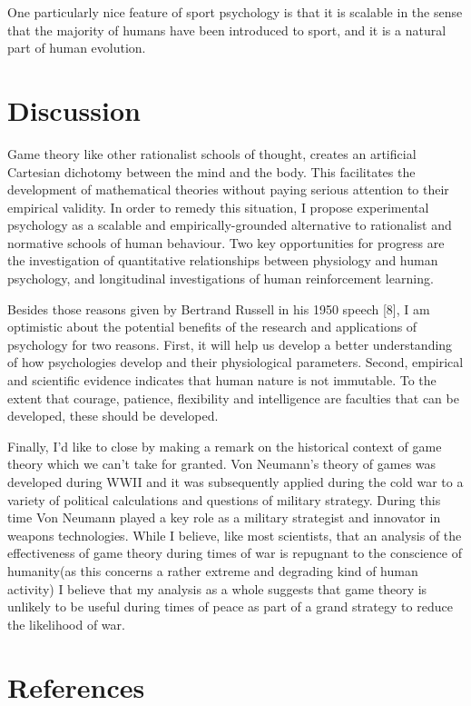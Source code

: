 \documentclass{article}
\begin{document}
One particularly nice feature of sport psychology is that it is scalable in the sense that the majority of humans have been introduced to sport, and it is 
a natural part of human evolution. 

\newpage

\section{Discussion}

Game theory like other rationalist schools of thought, creates an artificial Cartesian dichotomy between the mind and the body. This facilitates the development of mathematical theories without paying serious attention to their empirical validity. In order to remedy this situation, I propose 
experimental psychology as a scalable and empirically-grounded alternative 
to rationalist and normative schools of human behaviour. Two key opportunities
for progress are the investigation of quantitative relationships between physiology and human psychology, and longitudinal investigations of human reinforcement learning. 

Besides those reasons given by Bertrand Russell in his 1950 speech [8], I am optimistic about the potential benefits of the research and applications of 
psychology for two reasons. First, it will help us develop a better understanding
of how psychologies develop and their physiological parameters. Second, empirical and scientific evidence indicates that human nature is not immutable. To the extent that courage, patience, flexibility and intelligence are faculties that can be developed, these should be developed. 

Finally, I’d like to close by making a remark on the historical context of game theory which we can't take for granted. Von Neumann's theory of games was developed during WWII and it was subsequently applied during the cold war to a
variety of political calculations and questions of military strategy. During this time Von Neumann played a key role as a military strategist and innovator in weapons technologies.  While I believe, like most scientists, that an analysis of the
effectiveness of game theory during times of war is repugnant to the conscience of humanity(as this concerns a rather extreme
and degrading kind of human activity) I believe that my analysis as a whole suggests that game theory is unlikely to be
useful during times of peace as part of a grand strategy to reduce the likelihood of war.

\section*{References}
\end{document}
